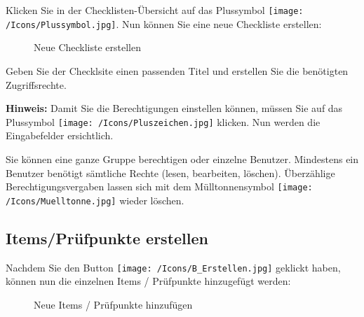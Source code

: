Klicken Sie in der Checklisten-Übersicht auf das Plussymbol \texttt{[image: /Icons/Plussymbol.jpg]}. Nun  können Sie eine neue Checkliste erstellen:

\begin{figure}[H]
\caption{Neue Checkliste erstellen}
\end{figure}

Geben Sie der Checklsite einen passenden Titel  und erstellen Sie die benötigten Zugriffsrechte.

\vspace{\baselineskip}

\textbf{Hinweis:} Damit Sie die Berechtigungen einstellen können, müssen Sie auf das Plussymbol \texttt{[image: /Icons/Pluszeichen.jpg]}  klicken. Nun werden die Eingabefelder ersichtlich.

\vspace{\baselineskip}

Sie können eine ganze Gruppe berechtigen oder einzelne Benutzer. Mindestens ein Benutzer benötigt sämtliche Rechte (lesen, bearbeiten, löschen). Überzählige Berechtigungsvergaben lassen sich mit dem Mülltonnensymbol \texttt{[image: /Icons/Muelltonne.jpg]} wieder löschen.

\subsection{Items/Prüfpunkte erstellen}

Nachdem Sie den Button \texttt{[image: /Icons/B\_Erstellen.jpg]} geklickt haben, können nun die einzelnen Items / Prüfpunkte hinzugefügt werden:

\begin{figure}[H]
\caption{Neue Items / Prüfpunkte hinzufügen}
\end{figure}

